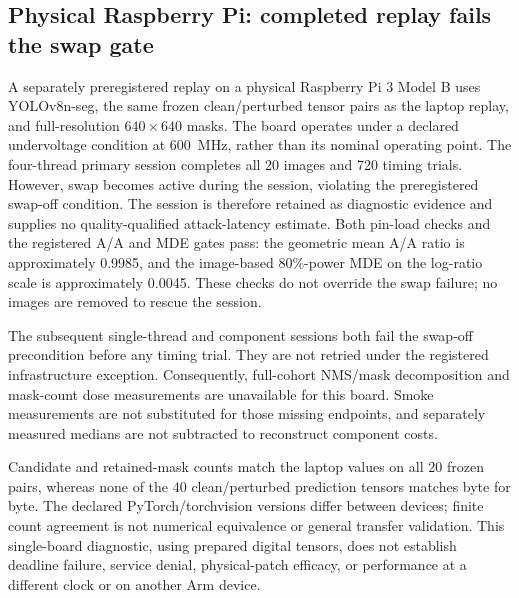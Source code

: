 \subsection{Physical Raspberry Pi: completed replay fails the swap gate}
\label{app:seg-pi3b-diagnostic}
A separately preregistered replay on a physical Raspberry Pi 3 Model B uses
YOLOv8n-seg, the same frozen clean/perturbed tensor pairs as the laptop replay,
and full-resolution $640\times640$ masks. The board operates under a declared
undervoltage condition at 600~MHz, rather than its nominal operating point.
The four-thread primary session completes all 20 images and 720 timing trials.
However, swap becomes active during the session, violating the preregistered
swap-off condition. The session is therefore retained as diagnostic evidence
and supplies no quality-qualified attack-latency estimate.
Both pin-load checks and the registered A/A and MDE gates pass: the geometric
mean A/A ratio is approximately 0.9985, and the image-based 80\%-power MDE
on the log-ratio scale is approximately 0.0045. These checks do not override
the swap failure; no images are removed to rescue the session.

The subsequent single-thread and component sessions both fail the swap-off
precondition before any timing trial. They are not retried under the registered
infrastructure exception. Consequently, full-cohort NMS/mask decomposition and
mask-count dose measurements are unavailable for this board. Smoke measurements
are not substituted for those missing endpoints, and separately measured
medians are not subtracted to reconstruct component costs.

Candidate and retained-mask counts match the laptop values on all 20 frozen
pairs, whereas none of the 40 clean/perturbed prediction tensors matches byte
for byte. The declared PyTorch/torchvision versions differ between devices;
finite count agreement is not numerical equivalence or general transfer
validation. This single-board diagnostic, using prepared digital tensors,
does not establish deadline failure, service denial, physical-patch efficacy,
or performance at a different clock or on another Arm device.
